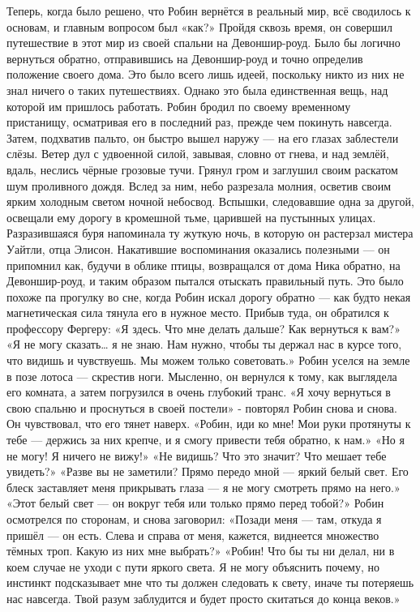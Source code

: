 \documentclass[a4paper,12pt]{book}
\begin{document}
	Теперь, когда было решено, что Робин вернётся в реальный мир, всё сводилось к основам, и главным вопросом был «как?» Пройдя сквозь время, он совершил путешествие в этот мир из своей спальни на Девоншир-роуд. Было бы логично вернуться обратно, отправившись на Девоншир-роуд и точно определив положение своего дома. Это было всего лишь идеей, поскольку никто из них не знал ничего о таких путешествиях. Однако это была единственная вещь, над которой им пришлось работать.
	Робин бродил по своему временному пристанищу, осматривая его в последний раз, прежде чем покинуть навсегда. Затем, подхватив пальто, он быстро вышел наружу — на его глазах заблестели слёзы. Ветер дул с удвоенной силой, завывая, словно от гнева, и над землёй, вдаль, неслись чёрные грозовые тучи. Грянул гром и заглушил своим раскатом шум проливного дождя. Вслед за ним, небо разрезала молния, осветив своим ярким холодным светом ночной небосвод. Вспышки, следовавшие одна за другой, освещали ему дорогу в кромешной тьме, царившей на пустынных улицах. Разразившаяся буря напоминала ту жуткую ночь, в которую он растерзал мистера Уайтли, отца Элисон.
	Накатившие воспоминания оказались полезными — он припомнил как, будучи в облике птицы, возвращался от дома Ника обратно, на Девоншир-роуд, и таким образом пытался отыскать правильный путь.
	Это было похоже па прогулку во сне, когда Робин искал дорогу обратно — как будто некая магнетическая сила тянула его в нужное место. Прибыв туда, он обратился к профессору Фергеру:
	«Я здесь. Что мне делать дальше? Как вернуться к вам?»
	«Я не могу сказать… я не знаю. Нам нужно, чтобы ты держал нас в курсе того, что видишь и чувствуешь. Мы можем только советовать.»
	Робин уселся на земле в позе лотоса — скрестив ноги. Мысленно, он вернулся к тому, как выглядела его комната, а затем погрузился в очень глубокий транс.
	«Я хочу вернуться в свою спальню и проснуться в своей постели» - повторял Робин снова и снова. Он чувствовал, что его тянет наверх.
	«Робин, иди ко мне! Мои руки протянуты к тебе — держись за них крепче, и я смогу привести тебя обратно, к нам.»
	«Но я не могу! Я ничего не вижу!»
	«Не видишь? Что это значит? Что мешает тебе увидеть?»
	«Разве вы не заметили? Прямо передо мной — яркий белый свет. Его блеск заставляет меня прикрывать глаза — я не могу смотреть прямо на него.»
	«Этот белый свет — он вокруг тебя или только прямо перед тобой?»
	Робин осмотрелся по сторонам, и снова заговорил:
«Позади меня — там, откуда я пришёл — он есть. Слева и справа от меня, кажется, виднеется множество тёмных троп. Какую из них мне выбрать?»
	«Робин! Что бы ты ни делал, ни в коем случае не уходи с пути яркого света. Я не могу объяснить почему, но инстинкт подсказывает мне что ты должен следовать к свету, иначе ты потеряешь нас навсегда. Твой разум заблудится и будет просто скитаться до конца веков.»
\end{document}
